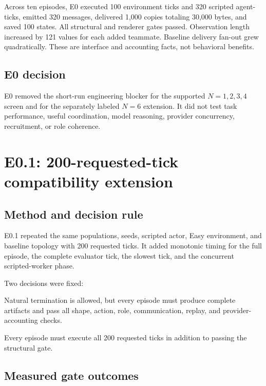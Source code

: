 \documentclass[11pt]{article}
\begin{document}
Across ten episodes, E0 executed 100 environment ticks and 320 scripted
agent-ticks, emitted 320 messages, delivered 1,000 copies totaling 30,000
bytes, and saved 100 states.  All structural and renderer gates passed.
Observation length increased by 121 values for each added teammate.  Baseline
delivery fan-out grew quadratically.  These are interface and accounting
facts, not behavioral benefits.

\subsection{E0 decision}

E0 removed the short-run engineering blocker for the supported
$N=1,2,3,4$ screen and for the separately labeled $N=6$ extension.  It did not
test task performance, useful coordination, model reasoning, provider
concurrency, recruitment, or role coherence.

\section{E0.1: 200-requested-tick compatibility extension}

\subsection{Method and decision rule}

E0.1 repeated the same populations, seeds, scripted actor, Easy environment,
and baseline topology with 200 requested ticks.  It added monotonic timing for
the full episode, the complete evaluator tick, the slowest tick, and the
concurrent scripted-worker phase.

Two decisions were fixed:

\begin{description}[style=nextline,leftmargin=1.5em]
  \item[Structural gate.]
  Natural termination is allowed, but every episode must produce complete
  artifacts and pass all shape, action, role, communication, replay, and
  provider-accounting checks.
  \item[Strict horizon gate.]
  Every episode must execute all 200 requested ticks in addition to passing the
  structural gate.
\end{description}

\subsection{Measured gate outcomes}
\end{document}
